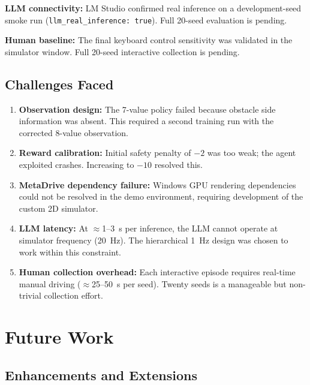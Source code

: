 \documentclass[12pt,a4paper]{report}
\begin{document}
\textbf{LLM connectivity:} LM Studio confirmed real inference on a development-seed smoke run (\texttt{llm\_real\_inference: true}). Full 20-seed evaluation is pending.

\textbf{Human baseline:} The final keyboard control sensitivity was validated in the simulator window. Full 20-seed interactive collection is pending.

\section{Challenges Faced}

\begin{enumerate}
  \item \textbf{Observation design:} The 7-value policy failed because obstacle side information was absent. This required a second training run with the corrected 8-value observation.
  \item \textbf{Reward calibration:} Initial safety penalty of $-2$ was too weak; the agent exploited crashes. Increasing to $-10$ resolved this.
  \item \textbf{MetaDrive dependency failure:} Windows GPU rendering dependencies could not be resolved in the demo environment, requiring development of the custom 2D simulator.
  \item \textbf{LLM latency:} At $\approx$1--3~s per inference, the LLM cannot operate at simulator frequency (20~Hz). The hierarchical 1~Hz design was chosen to work within this constraint.
  \item \textbf{Human collection overhead:} Each interactive episode requires real-time manual driving ($\approx$25--50~s per seed). Twenty seeds is a manageable but non-trivial collection effort.
\end{enumerate}

\chapter{Future Work}

\section{Enhancements and Extensions}
\end{document}
